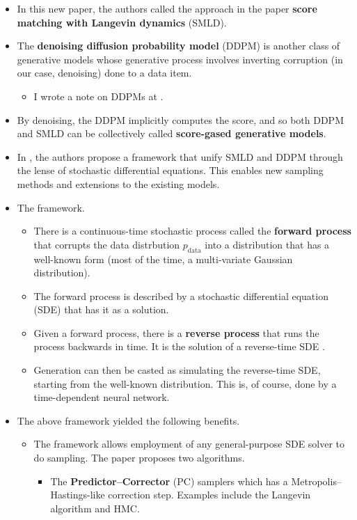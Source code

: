 \documentclass[10pt]{article}
\newcommand{\mrm}[1]{\mathrm{#1}}
\begin{document}
\begin{itemize}
  \item In this new paper, the authors called the approach in the \cite{Song:2019} paper {\bf score matching with Langevin dynamics} (SMLD).

  \item The {\bf denoising diffusion probability model} (DDPM) \cite{SohlDickstein:2015,Ho:2020} is another class of generative models whose generative process involves inverting corruption (in our case, denoising) done to a data item.
  \begin{itemize}
    \item I wrote a note on DDPMs at \cite{KhungurnDdpm}.
  \end{itemize}
  
  \item By denoising, the DDPM implicitly computes the score, and so both DDPM and SMLD can be collectively called {\bf score-gased generative models}.
  
  \item In \cite{Song:2021}, the authors propose a framework that unify SMLD and DDPM through the lense of stochastic differential equations. This enables new sampling methods and extensions to the existing models.
  
  \item The framework.
  \begin{itemize}
    \item There is a continuous-time stochastic process called the {\bf forward process} that corrupts the data distrbution $p_{\mrm{data}}$ into a distribution that has a well-known form (most of the time, a multi-variate Gaussian distribution).
    
    \item The forward process is described by a stochastic differential equation (SDE) that has it as a solution.
    
    \item Given a forward process, there is a {\bf reverse process} that runs the process backwards in time. It is the solution of a reverse-time SDE \cite{Anderson:1982}.
    
    \item Generation can then be casted as simulating the reverse-time SDE, starting from the well-known distribution. This is, of course, done by a time-dependent neural network.
  \end{itemize}

  \item The above framework yielded the following benefits.
  \begin{itemize}
    \item The framework allows employment of any general-purpose SDE solver to do sampling. The paper proposes two algorithms.
    \begin{itemize}
      \item The {\bf Predictor--Corrector} (PC) samplers which has a Metropolis--Hastings-like correction step. Examples include the Langevin algorithm and HMC.
      

\end{itemize}
\end{itemize}
\end{itemize}
\end{document}
